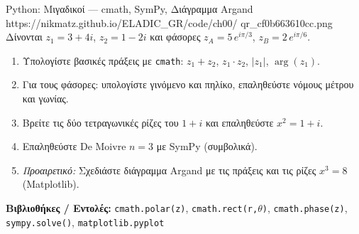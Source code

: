 \begin{pybox}{Python: Μιγαδικοί — cmath, SymPy, Διάγραμμα Argand}%
             {https://nikmatz.github.io/ELADIC_GR/code/ch00/}%
             {qr_cf0b663610cc.png}
\label{py:ch0_complex}
Δίνονται $z_1 = 3+4i$, $z_2 = 1-2i$ και φάσορες
$z_A = 5\,e^{i\pi/3}$, $z_B = 2\,e^{i\pi/6}$.
\begin{enumerate}[label=(\alph*),itemsep=2pt]
  \item Υπολογίστε βασικές πράξεις με \texttt{cmath}:
    $z_1+z_2$, $z_1 \cdot z_2$, $|z_1|$, $\arg(z_1)$.
  \item Για τους φάσορες: υπολογίστε γινόμενο και πηλίκο,
    επαληθεύστε νόμους μέτρου και γωνίας.
  \item Βρείτε τις δύο τετραγωνικές ρίζες του $1+i$
    και επαληθεύστε $x^2 = 1+i$.
  \item Επαληθεύστε De Moivre $n=3$ με SymPy (συμβολικά).
  \item \textit{Προαιρετικό:} Σχεδιάστε διάγραμμα Argand
    με τις πράξεις και τις ρίζες $x^3=8$ (Matplotlib).
\end{enumerate}
\medskip
\textbf{Βιβλιοθήκες / Εντολές:}
\texttt{cmath.polar(z)}, \texttt{cmath.rect(r,$\theta$)},
\texttt{cmath.phase(z)}, \texttt{sympy.solve()},
\texttt{matplotlib.pyplot}
\end{pybox}
